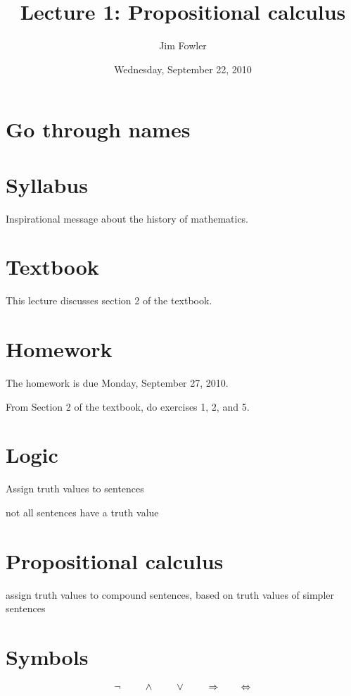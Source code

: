 \documentclass[12pt]{handout}
\title{Lecture 1: Propositional calculus}
\author{Jim Fowler}
\date{Wednesday, September 22, 2010}
\begin{document}
\maketitle

\section*{Go through names}

\section*{Syllabus}

Inspirational message about the history of mathematics.

\section*{Textbook}

This lecture discusses section 2 of the textbook.

\section*{Homework} 

The homework is due Monday, September 27, 2010.

From Section 2 of the textbook, do exercises 1, 2, and 5.

\section*{Logic}

Assign truth values to sentences

not all sentences have a truth value

\section*{Propositional calculus}

assign truth values to compound sentences, based on truth values of simpler sentences

\section*{Symbols}

$$ \Huge
\neg \hspace{1em} \wedge \hspace{1em} \vee \hspace{1em} \Rightarrow \hspace{1em} \Leftrightarrow
$$
\end{document}
